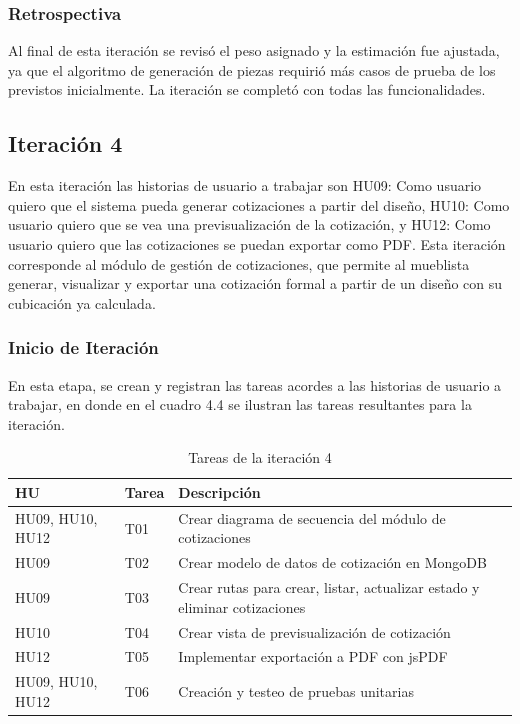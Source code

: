 ﻿\documentclass{iccmemoria}
\begin{document}
\subsubsection{Retrospectiva}
Al final de esta iteración se revisó el peso asignado y la estimación fue ajustada, ya que el algoritmo de generación de piezas requirió más casos de prueba de los previstos inicialmente. La iteración se completó con todas las funcionalidades.

\subsection{Iteración 4}
En esta iteración las historias de usuario a trabajar son HU09: Como usuario quiero que el sistema pueda generar cotizaciones a partir del diseño, HU10: Como usuario quiero que se vea una previsualización de la cotización, y HU12: Como usuario quiero que las cotizaciones se puedan exportar como PDF. Esta iteración corresponde al módulo de gestión de cotizaciones, que permite al mueblista generar, visualizar y exportar una cotización formal a partir de un diseño con su cubicación ya calculada.

\subsubsection{Inicio de Iteración}
En esta etapa, se crean y registran las tareas acordes a las historias de usuario a trabajar, en donde en el cuadro 4.4 se ilustran las tareas resultantes para la iteración.

\begin{table}[H]
    \centering
    \caption{Tareas de la iteración 4}
    \label{tab:tareas_iteracion4}
    \begin{tabular}{|p{2cm}|p{2cm}|p{7cm}|}
        \hline
        \textbf{HU} & \textbf{Tarea} & \textbf{Descripción}\\
        \hline
HU09, HU10, HU12 & T01 & Crear diagrama de secuencia del módulo de cotizaciones\\
\hline
HU09 & T02 & Crear modelo de datos de cotización en MongoDB\\
\hline
HU09 & T03 & Crear rutas para crear, listar, actualizar estado y eliminar cotizaciones\\
\hline
HU10 & T04 & Crear vista de previsualización de cotización\\
\hline
HU12 & T05 & Implementar exportación a PDF con jsPDF\\
\hline
HU09, HU10, HU12 & T06 & Creación y testeo de pruebas unitarias\\
        \hline
    \end{tabular}
\end{table}
\end{document}
